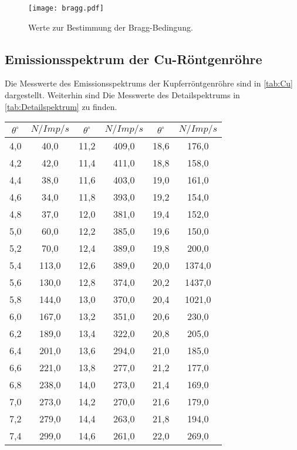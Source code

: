 \begin{figure}
  \centering
  \texttt{[image: bragg.pdf]}
  \caption{Werte zur Bestimmung der Bragg-Bedingung.}
  \label{fig:bragg}
\end{figure}

\subsection{Emissionsspektrum der Cu-Röntgenröhre}
\label{sec:cu}
Die Messwerte des Emissionsspektrums der Kupferröntgenröhre sind in \autoref{tab:Cu} dargestellt. Weiterhin sind Die
Messwerte des Detailspektrums in \autoref{tab:Detailspektrum} zu finden.

\begin{table}
  \centering
  \begin{tabular}{c c | c c | c c}
    \toprule
    $\theta^{\circ}$ & $N/Imp/s$ & $\theta^{\circ}$ & $N/Imp/s$ & $\theta^{\circ}$ & $N/Imp/s$ \\
    \midrule
     4,0 &  40,0 & 11,2 & 409,0 & 18,6 &  176,0 \\
     4,2 &  42,0 & 11,4 & 411,0 & 18,8 &  158,0 \\
     4,4 &  38,0 & 11,6 & 403,0 & 19,0 &  161,0 \\
     4,6 &  34,0 & 11,8 & 393,0 & 19,2 &  154,0 \\
     4,8 &  37,0 & 12,0 & 381,0 & 19,4 &  152,0 \\
     5,0 &  60,0 & 12,2 & 385,0 & 19,6 &  150,0 \\
     5,2 &  70,0 & 12,4 & 389,0 & 19,8 &  200,0 \\
     5,4 & 113,0 & 12,6 & 389,0 & 20,0 & 1374,0 \\
     5,6 & 130,0 & 12,8 & 374,0 & 20,2 & 1437,0 \\
     5,8 & 144,0 & 13,0 & 370,0 & 20,4 & 1021,0 \\
     6,0 & 167,0 & 13,2 & 351,0 & 20,6 &  230,0 \\
     6,2 & 189,0 & 13,4 & 322,0 & 20,8 &  205,0 \\
     6,4 & 201,0 & 13,6 & 294,0 & 21,0 &  185,0 \\
     6,6 & 221,0 & 13,8 & 277,0 & 21,2 &  177,0 \\
     6,8 & 238,0 & 14,0 & 273,0 & 21,4 &  169,0 \\
     7,0 & 273,0 & 14,2 & 270,0 & 21,6 &  179,0 \\
     7,2 & 279,0 & 14,4 & 263,0 & 21,8 &  194,0 \\
     7,4 & 299,0 & 14,6 & 261,0 & 22,0 &  269,0 \\

\end{tabular}
\end{table}
